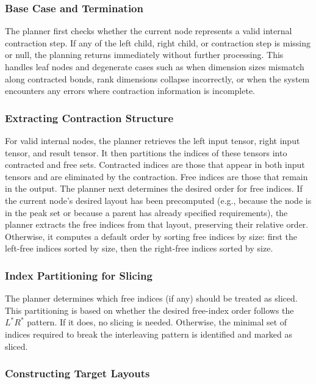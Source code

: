\subsubsection{Base Case and Termination}

The planner first checks whether the current node represents a valid internal contraction step. If any of the left child, right child, or contraction step is missing or null, the planning returns immediately without further processing. This handles leaf nodes and degenerate cases such as when dimension sizes mismatch along contracted bonds, rank dimensions collapse incorrectly, or when the system encounters any errors where contraction information is incomplete.

\subsubsection{Extracting Contraction Structure}

For valid internal nodes, the planner retrieves the left input tensor, right input tensor, and result tensor. It then partitions the indices of these tensors into contracted and free sets. Contracted indices are those that appear in both input tensors and are eliminated by the contraction. Free indices are those that remain in the output. The planner next determines the desired order for free indices. If the current node's desired layout has been precomputed (e.g., because the node is in the peak set or because a parent has already specified requirements), the planner extracts the free indices from that layout, preserving their relative order. Otherwise, it computes a default order by sorting free indices by size: first the left-free indices sorted by size, then the right-free indices sorted by size.

\subsubsection{Index Partitioning for Slicing}

The planner determines which free indices (if any) should be treated as sliced. This partitioning is based on whether the desired free-index order follows the $L^* R^*$ pattern. If it does, no slicing is needed. Otherwise, the minimal set of indices required to break the interleaving pattern is identified and marked as sliced.

\subsubsection{Constructing Target Layouts}

